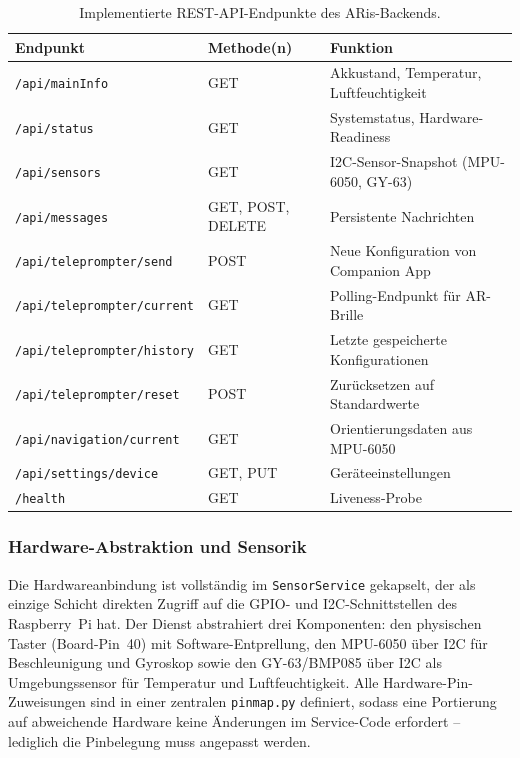 \begin{table}[htbp]
  \centering
  \caption{Implementierte REST-API-Endpunkte des ARis-Backends.}
  \label{tab:endpoints}
  \begin{tabularx}{\textwidth}{@{} l l X @{}}
    \toprule
    \textbf{Endpunkt} & \textbf{Methode(n)} & \textbf{Funktion} \\
    \midrule
    \texttt{/api/mainInfo}               & GET              & Akkustand, Temperatur, Luftfeuchtigkeit \\
    \texttt{/api/status}                 & GET              & Systemstatus, Hardware-Readiness \\
    \texttt{/api/sensors}                & GET              & I2C-Sensor-Snapshot (MPU-6050, GY-63) \\
    \texttt{/api/messages}               & GET, POST, DELETE & Persistente Nachrichten \\
    \texttt{/api/teleprompter/send}      & POST             & Neue Konfiguration von Companion App \\
    \texttt{/api/teleprompter/current}   & GET              & Polling-Endpunkt für AR-Brille \\
    \texttt{/api/teleprompter/history}   & GET              & Letzte gespeicherte Konfigurationen \\
    \texttt{/api/teleprompter/reset}     & POST             & Zurücksetzen auf Standardwerte \\
    \texttt{/api/navigation/current}     & GET              & Orientierungsdaten aus MPU-6050 \\
    \texttt{/api/settings/device}        & GET, PUT         & Geräteeinstellungen \\
    \texttt{/health}                     & GET              & Liveness-Probe \\
    \bottomrule
  \end{tabularx}
\end{table}

\subsubsection{Hardware-Abstraktion und Sensorik}
\label{subsubsec:hardwareImpl}

Die Hardwareanbindung ist vollständig im \texttt{SensorService} gekapselt,
der als einzige Schicht direkten Zugriff auf die GPIO- und I2C-Schnittstellen
des Raspberry~Pi hat.
Der Dienst abstrahiert drei Komponenten: den physischen Taster
(Board-Pin~40) mit Software-Entprellung, den MPU-6050 über I2C für
Beschleunigung und Gyroskop sowie den GY-63/BMP085 über I2C als
Umgebungssensor für Temperatur und Luftfeuchtigkeit.
Alle Hardware-Pin-Zuweisungen sind in einer zentralen \texttt{pinmap.py} definiert,
sodass eine Portierung auf abweichende Hardware keine Änderungen im
Service-Code erfordert -- lediglich die Pinbelegung muss angepasst werden.

